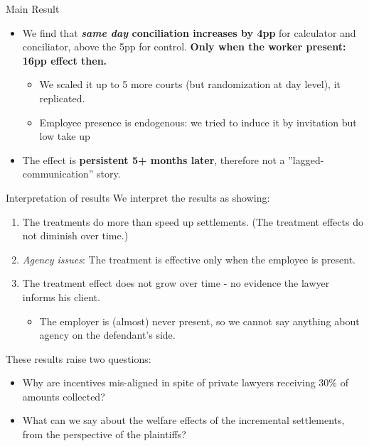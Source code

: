\documentclass[9pt]{beamer}
\begin{document}
\begin{frame}{Main Result}
    \begin{itemize}
        \item We find that \textbf{\textit{same day} conciliation increases by 4pp} for calculator and conciliator, above the 5pp for control. \alert{\textbf{Only when the worker present: 16pp effect then.}}
            \begin{itemize}
               \item We scaled it up to 5 more courts (but randomization at day level), it replicated.
                \item  Employee presence is endogenous: we tried to induce it by invitation but low take up
            \end{itemize}
        \vspace{0.05in}
        \item The effect is \textbf{persistent 5+ months later}, therefore not a ''lagged-communication'' story. 
        \vspace{0.05in}
        
    \end{itemize}
  \hskip-5.0cm
 \begin{table}
    \label{Treatment_effects}
    \tiny{}
\end{table}
\end{frame}

\begin{frame}{Interpretation of results}
    We interpret the results as showing:
    \vspace{.1in}
    \begin{enumerate}
        \item The treatments do more than speed up settlements. (The treatment effects do not diminish over time.)
        
        
        \item \textit{Agency issues}: The treatment is effective only when the employee is present. 
        \item The treatment effect does not grow over time - no evidence the lawyer informs his client.
        \begin{itemize}
            \item The employer is (almost) never present, so we cannot say anything about agency on the defendant's side. 
        \end{itemize}
    \end{enumerate}
    \pause
    These results raise two questions:
    \begin{itemize}
        \item Why are incentives mis-aligned in spite of private lawyers receiving 30\% of amounts collected?
        \item What can we say about the welfare effects of the incremental settlements, from the perspective of the plaintiffs?
    \end{itemize}
\end{frame}
\end{document}
